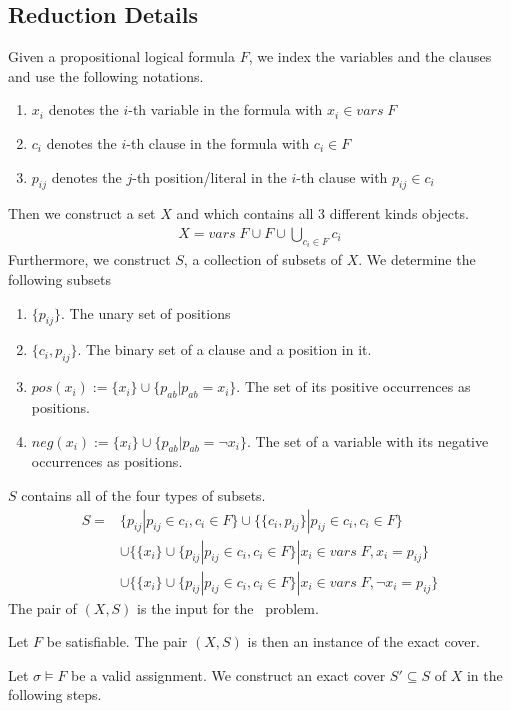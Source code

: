 \subsection{Reduction Details}
Given a propositional logical formula $F$, we index the variables and the clauses and use the following notations.
\begin{enumerate}
    \item $x_i$ denotes the $i$-th variable in the formula with $x_i \in vars\; F$
    \item $c_i$ denotes the $i$-th clause in the formula with $c_i \in F$
    \item $p_{ij}$ denotes the $j$-th position/literal in the $i$-th clause with $p_{ij} \in c_i$
\end{enumerate} 
Then we construct a set $X$ and which contains all 3 different kinds objects. 
\begin{align*}
    X = vars\; F \cup F \cup \bigcup_{c_i \in F} c_i
\end{align*}
Furthermore, we construct $S$, a collection of subsets of $X$. We determine the following subsets
\begin{enumerate}
    \item $\{p_{ij}\}$. The unary set of positions
    \item $\{c_i, p_{ij}\}$. The binary set of a clause and a position in it.
    \item $pos(x_i) := \{x_i\} \cup \{p_{ab} | p_{ab} = x_i\}$. The set of its positive occurrences as positions.
    \item $neg(x_i):= \{x_i\} \cup \{p_{ab} | p_{ab} = \neg x_i\}$. The set of a variable with  its negative occurrences as positions.
\end{enumerate}
$S$ contains all of the four types of subsets.
\begin{align*}
    S =& \{{p_{ij}} | p_{ij} \in c_i, c_i \in F \} 
    \cup \{\{c_i, p_{ij}\} | p_{ij} \in c_i, c_i \in F \} \\
    &\cup \{\{x_i\} \cup \{p_{ij} | p_{ij} \in c_i, c_i \in F\} | x_i \in vars\; F, x_i = p_{ij}\}\\
    &\cup \{\{x_i\} \cup \{p_{ij} | p_{ij} \in c_i, c_i \in F\} | x_i \in vars\; F, \neg x_i = p_{ij}\}
\end{align*}
The pair of $(X, S)$ is the input for the \XC\ problem. 
\begin{lemma}[Soundess]
    Let $F$ be satisfiable. The pair $(X, S)$ is then an instance of the exact cover.
\end{lemma}
Let $\sigma \models F$ be a valid assignment. We construct an exact cover $S' \subseteq S$ of $X$ in the following steps.
